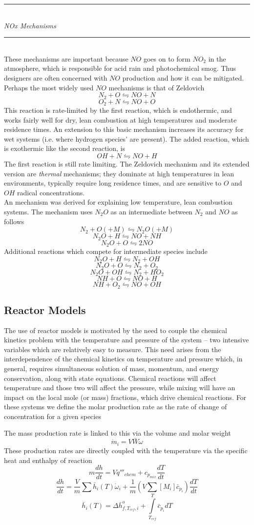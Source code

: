 \documentclass[11pt]{article}
\newcommand{\Header}[1]{\noindent\rule{\textwidth}{0.4pt}\\[0.3cm]\indent \large{\textit{#1}}\normalsize{}\\[-0.1cm]\noindent\rule{\textwidth}{0.4pt}}
\newcommand{\CenteredBoxed}[1]{\begin{center}\boxed{#1}\end{center}}
\newcommand{\intlim}[2]{\int\limits_{#1}^{#2}}
\begin{document}
\Header{NOx Mechanisms}\\

These mechanisms are important because $NO$ goes on to form $NO_2$ in the atmosphere, which is responsible for acid rain and photochemical smog. Thus designers are often concerned with $NO$ production and how it can be mitigated. Perhaps the most widely used $NO$ mechanisms is that of Zeldovich
$$N_2 + O \leftrightharpoons NO + N$$
$$O_2 + N \leftrightharpoons NO + O$$
This reaction is rate-limited by the first reaction, which is endothermic, and works fairly well for dry, lean combustion at high temperatures and moderate residence times. An extension to this basic mechanism increases its accuracy for wet systems (i.e. where hydrogen species' are present). The added reaction, which is exothermic like the second reaction, is
$$OH + N \leftrightharpoons NO + H$$
The first reaction is still rate limiting. The Zeldovich mechanism and its extended version are \emph{thermal} mechanisms; they dominate at high temperatures in lean environments, typically require long residence times, and are sensitive to $O$ and $OH$ radical concentrations.\\

An mechanism was derived for explaining low temperature, lean combustion systems. The mechanism uses $N_2O$ as an intermediate between $N_2$ and $NO$ as follows
$$N_2 + O (+ M) \leftrightharpoons N_2O (+ M)$$
$$N_2O+H \leftrightharpoons NO + NH$$
$$N_2O + O \leftrightharpoons 2NO$$
Additional reactions which compete for intermediate species include
$$N_2O + H \leftrightharpoons N_2 + OH$$
$$N_2O + O \leftrightharpoons N_2 + O_2$$
$$N_2O + OH \leftrightharpoons N_2 + HO_2$$
$$NH + O \leftrightharpoons NO + H$$
$$NH + O_2 \leftrightharpoons NO + OH$$

\subsection{Reactor Models}
The use of reactor models is motivated by the need to couple the chemical kinetics problem with the temperature and pressure of the system -- two intensive variables which are relatively easy to measure. This need arises from the interdependence of the chemical kinetics on temperature and pressure which, in general, requires simultaneous solution of mass, momentum, and energy conservation, along with state equations. Chemical reactions will affect temperature and those two will affect the pressure, while mixing will have an impact on the local mole (or mass) fractions, which drive chemical reactions. For these systems we define the molar production rate as the rate of change of concentration for a given species
\CenteredBoxed{\dot\omega_i = \frac{d[M_i]}{dt}\equiv\frac{mole}{m^3s}}
The mass production rate is linked to this via the volume and molar weight
$$\dot m_i = V\bar{W}\dot\omega$$
These production rates are directly coupled with the temperature via the specific heat and enthalpy of reaction
$$m\frac{dh}{dt} = V\dot q'''_{chem} + c_{p_{mix}}\frac{dT}{dt}$$
$$\frac{dh}{dt} = \frac{V}{m}\sum\bar h_i(T)\dot\omega_i + \frac{1}{m}\left(V\sum[M_i]\bar c_{p_i}\right)\frac{dT}{dt}$$
$$\bar h_i(T) = \Delta\bar h_{f,T_{ref},i}^o + \intlim{T_{ref}}{T}\bar c_{p_i}dT$$
\end{document}
